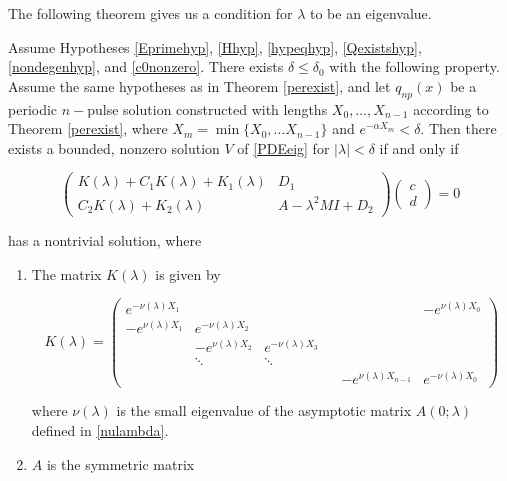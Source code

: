 \documentclass[thesis.tex]{subfiles}
\begin{document}
The following theorem gives us a condition for $\lambda$ to be an eigenvalue.


\begin{theorem}\label{blockmatrixtheorem}
Assume Hypotheses \ref{Eprimehyp}, \ref{Hhyp}, \ref{hypeqhyp}, \ref{Qexistshyp}, \ref{nondegenhyp}, and \ref{c0nonzero}. There exists $\delta \leq \delta_0$ with the following property. Assume the same hypotheses as in Theorem \ref{perexist}, and let $q_{np}(x)$ be a periodic $n-$pulse solution constructed with lengths $X_0, \dots, X_{n-1}$ according to Theorem \ref{perexist}, where $X_m = \min\{ X_0, \dots X_{n-1}\}$ and $e^{-\alpha X_m} < \delta$. Then there exists a bounded, nonzero solution $V$ of \eqref{PDEeig} for $|\lambda| < \delta$ if and only if 

\begin{equation}\label{blockeq}
\begin{pmatrix}
K(\lambda) + C_1 K(\lambda) + K_1(\lambda) & D_1 \\
C_2 K(\lambda) + K_2(\lambda) & A - \lambda^2 MI + D_2
\end{pmatrix}
\begin{pmatrix} c \\ d \end{pmatrix} = 0
\end{equation}

has a nontrivial solution, where 

\begin{enumerate}

\item The matrix $K(\lambda)$ is given by

\begin{equation}
K(\lambda) = 
\begin{pmatrix}
e^{-\nu(\lambda)X_1} & & & & & -e^{\nu(\lambda)X_0} \\
-e^{\nu(\lambda)X_1} & e^{-\nu(\lambda)X_2} \\
& -e^{\nu(\lambda)X_2} & e^{-\nu(\lambda)X_3} \\
& \ddots & \ddots & &&  \\
& & & & -e^{\nu(\lambda)X_{n-1}} & e^{-\nu(\lambda)X_0} 
\end{pmatrix}
\end{equation}

where $\nu(\lambda)$ is the small eigenvalue of the asymptotic matrix $A(0; \lambda)$ defined in \eqref{nulambda}.

\item $A$ is the symmetric matrix


\end{enumerate}
\end{theorem}
\end{document}
